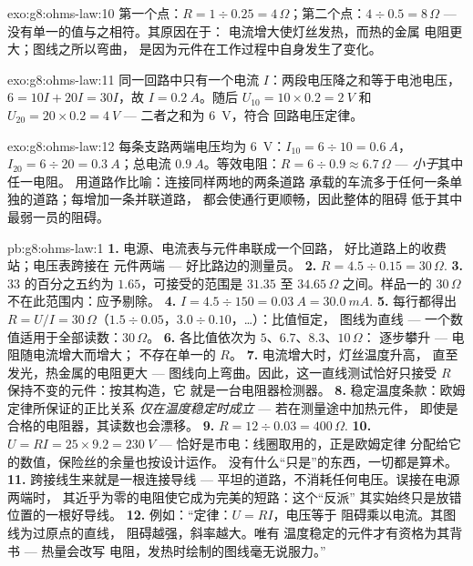 \begin{solution}{exo:g8:ohms-law:10}
第一个点：$R = 1 \div 0.25 = 4\,\Omega$；第二个点：$4 \div
0.5 = 8\,\Omega$ --- 没有单一的值与之相符。其原因在于：
电流增大使灯丝发热，而热的金属
电阻更大；图线之所以弯曲，
是因为元件在工作过程中自身发生了变化。
\end{solution}

\begin{solution}{exo:g8:ohms-law:11}
同一回路中只有一个电流 $I$：两段电压降之和等于电池电压，
$6 = 10 I + 20 I = 30 I$，故 $I = \qty{0.2}{A}$。随后 $U_{10}
= 10 \times 0.2 = \qty{2}{V}$ 和 $U_{20} = 20 \times 0.2 =
\qty{4}{V}$ --- 二者之和为 \qty{6}{V}，符合
回路电压定律。
\end{solution}

\begin{solution}{exo:g8:ohms-law:12}
每条支路两端电压均为 \qty{6}{V}：$I_{10} = 6 \div 10 =
\qty{0.6}{A}$，$I_{20} = 6 \div 20 = \qty{0.3}{A}$；总电流
$\qty{0.9}{A}$。等效电阻：$R = 6 \div 0.9 \approx
6.7\,\Omega$ --- \emph{小于}其中任一电阻。
用道路作比喻：连接同样两地的两条道路
承载的车流多于任何一条单独的道路；每增加一条并联道路，
都会使通行更顺畅，因此整体的阻碍
低于其中最弱一员的阻碍。
\end{solution}

\begin{solution}{pb:g8:ohms-law:1}
\textbf{1.} 电源、电流表与元件串联成一个回路，
好比道路上的收费站；电压表跨接在
元件两端 --- 好比路边的测量员。
\textbf{2.} $R = 4.5 \div 0.15 = 30\,\Omega$.
\textbf{3.} $33$ 的百分之五约为 $1.65$，可接受的范围是
$31.35$ 至 $34.65\,\Omega$ 之间。样品一的 $30\,\Omega$
不在此范围内：应予剔除。
\textbf{4.} $I = 4.5 \div 150 = \qty{0.03}{A} =
\qty{30.0}{mA}$.
\textbf{5.} 每行都得出 $R = U/I = 30\,\Omega$（$1.5
\div 0.05$，$3.0 \div 0.10$，\dots）：比值恒定，
图线为直线 --- 一个数值适用于全部读数：$30\,\Omega$。
\textbf{6.} 各比值依次为 $5$、$6.7$、$8.3$、$10\,\Omega$：
逐步攀升 --- 电阻随电流增大而增大；
不存在单一的 $R$。
\textbf{7.} 电流增大时，灯丝温度升高，
直至发光，热金属的电阻更大 ---
图线向上弯曲。因此，这一直线测试恰好只接受
$R$ 保持不变的元件：按其构造，它
就是一台电阻器检测器。
\textbf{8.} 稳定温度条款：欧姆定律所保证的正比关系
\emph{仅在温度稳定时成立} --- 若在测量途中加热元件，
即使是合格的电阻器，其读数也会漂移。
\textbf{9.} $R = 12 \div 0.03 = 400\,\Omega$.
\textbf{10.} $U = R I = 25 \times 9.2 = \qty{230}{V}$ ---
恰好是市电：线圈取用的，正是欧姆定律
分配给它的数值，保险丝的余量也按设计运作。
没有什么“只是”的东西，一切都是算术。
\textbf{11.} 跨接线生来就是一根连接导线 ---
平坦的道路，不消耗任何电压。误接在电源两端时，
其近乎为零的电阻使它成为完美的短路：这个“反派”
其实始终只是放错位置的一根好导线。
\textbf{12.} 例如：“定律：$U = R I$，电压等于
阻碍乘以电流。其图线为过原点的直线，
阻碍越强，斜率越大。唯有
温度稳定的元件才有资格为其背书 --- 热量会改写
电阻，发热时绘制的图线毫无说服力。”
\end{solution}
